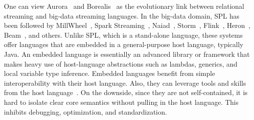 One can view \textsf{Aurora}~\cite{abadi_et_al_2003} and
\textsf{Borealis}~\cite{abadi_et_al_2005} as the evolutionary link
between relational streaming and big-data streaming languages.
In the big-data domain, SPL has been followed by
\textsf{MillWheel}~\cite{akidau_et_al_2013},
\textsf{Spark Streaming}~\cite{zaharia_et_al_2013},
\textsf{Naiad}~\cite{murray_et_al_2013},
\textsf{Storm}~\cite{toshniwal_et_al_2014},
\textsf{Flink}~\cite{carbone_et_al_2015},
\textsf{Heron}~\cite{kulkarni_et_al_2015},
\textsf{Beam}~\cite{akidau_et_al_2015},
and others.  Unlike SPL, which is a stand-alone language, these
systems offer languages that are embedded in a general-purpose host
language, typically Java. An embedded language is essentially an
advanced library or framework that makes heavy use of host-language
abstractions such as lambdas, generics, and local variable type
inference. Embedded languages benefit from simple interoperability
with their host language. Also, they can leverage tools and skills
from the host language~\cite{hudak_1998}. On the downside, since they
are not self-contained, it is hard to isolate clear core semantics
without pulling in the host language. This inhibits debugging,
optimization, and standardization.
